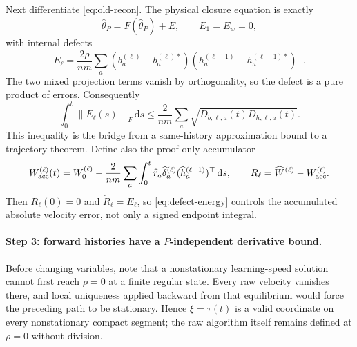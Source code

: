 \documentclass[11pt]{article}
\theoremstyle{definition}
\theoremstyle{remark}
\newcommand{\norm}[1]{\left\lVert #1\right\rVert}
\newcommand{\dd}{\,\mathrm{d}}
\begin{document}
Next differentiate \eqref{eq:old-recon}.  The physical closure equation is
exactly
\begin{equation}
 \dot{\widehat\theta}_P=F(\widehat\theta_P)+E,\qquad E_1=E_w=0,
\end{equation}
with internal defects
\begin{equation}
 E_\ell=\frac{2\rho}{nm}\sum_a
 (b^{(\ell)}_a-b^{(\ell)*}_a)(h^{(\ell-1)}_a-h^{(\ell-1)*}_a)^\top. \label{eq:defect}
\end{equation}
The two mixed projection terms vanish by orthogonality, so the defect is a pure
product of errors.  Consequently
\begin{equation}
 \int_0^t\norm{E_\ell(s)}_F\dd s
 \le\frac{2}{nm}\sum_a\sqrt{D_{b,\ell,a}(t)D_{h,\ell,a}(t)}. \label{eq:defect-energy}
\end{equation}
This inequality is the bridge from a same-history approximation bound to a
trajectory theorem.  Define also the proof-only accumulator
\[
 W^{(\ell)}_{\rm acc}(t)=W_0^{(\ell)}
 -\frac{2}{nm}\sum_a\int_0^t
 \widehat r_a\widehat\delta_a^{(\ell)}
 (\widehat h_a^{(\ell-1)})^\top\dd s,\qquad
 R_\ell=\widehat W^{(\ell)}-W^{(\ell)}_{\rm acc}.
\]
Then $R_\ell(0)=0$ and $\dot R_\ell=E_\ell$, so \eqref{eq:defect-energy}
controls the accumulated absolute velocity error, not only a signed endpoint
integral.

\paragraph{Step 3: forward histories have a $P$-independent derivative bound.}
Before changing variables, note that a nonstationary learning-speed solution
cannot first reach $\rho=0$ at a finite regular state.  Every raw velocity
vanishes there, and local uniqueness applied backward from that equilibrium
would force the preceding path to be stationary.  Hence $\xi=\tau(t)$ is a
valid coordinate on every nonstationary compact segment; the raw algorithm
itself remains defined at $\rho=0$ without division.
\end{document}
